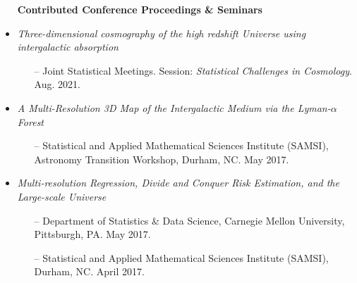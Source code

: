 \documentclass[letterpaper,10pt]{article}
\begin{document}
\begin{itemize}
\item[] \hspace{-6ex} {\bf Contributed Conference Proceedings \& Seminars} 
\item {\it Three-dimensional cosmography of the high redshift Universe using intergalactic absorption}

\vspace{-0.05cm}

\begin{itemize}
\item[--] Joint Statistical Meetings. Session: {\it Statistical Challenges in Cosmology}. Aug. 2021.
\end{itemize}


\vspace{0.1cm}


\item {\it A Multi-Resolution 3D Map of the Intergalactic Medium via the Lyman-$\alpha$ Forest}

\vspace{-0.05cm}

\begin{itemize}
\item[--] Statistical and Applied Mathematical Sciences Institute (SAMSI), Astronomy Transition Workshop, Durham, NC. May 2017.
\end{itemize}


\vspace{0.1cm}


\item {\it Multi-resolution Regression, Divide and Conquer Risk Estimation, and the Large-scale Universe}

\vspace{-0.05cm}

\begin{itemize}
\item[--] Department of Statistics \& Data Science, Carnegie Mellon University, Pittsburgh, PA. May 2017.

\vspace{0.05cm}

\item[--] Statistical and Applied Mathematical Sciences Institute (SAMSI), Durham, NC. April 2017.

\end{itemize}


\vspace{0.1cm}



\end{itemize}
\end{document}
